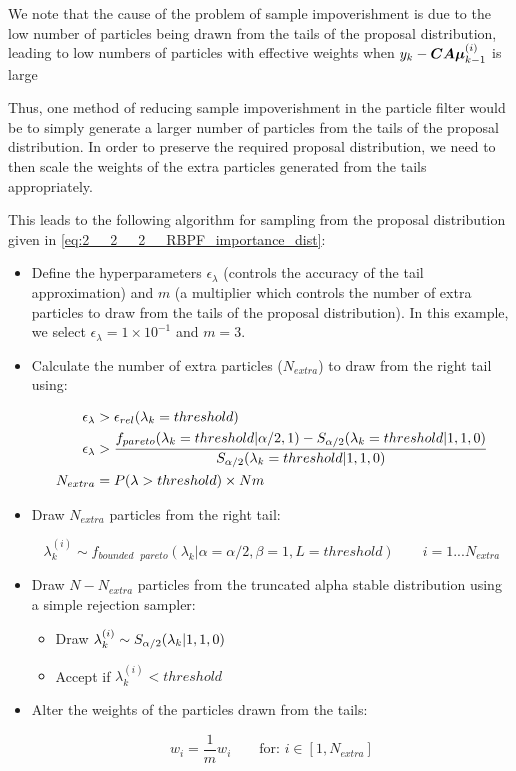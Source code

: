 \documentclass[../main.tex]{subfiles}
\begin{document}
We note that the cause of the problem of sample impoverishment is due to the low number of particles being drawn from the tails of the proposal distribution, leading to low numbers of particles with effective weights when $y_k - \bm{CA\mu}_{k-1}^{(i)}$ is large

Thus, one method of reducing sample impoverishment in the particle filter would be to simply generate a larger number of particles from the tails of the proposal distribution. In order to preserve the required proposal distribution, we need to then scale the weights of the extra particles generated from the tails appropriately. 

This leads to the following algorithm for sampling from the proposal distribution given in \autoref{eq:2__2__2__RBPF_importance_dist}: 

\begin{itemize}
	
	\item Define the hyperparameters $\epsilon_\lambda$ (controls the accuracy of the tail approximation) and $m$ (a multiplier which controls the number of extra particles to draw from the tails of the proposal distribution). In this example, we select $\epsilon_\lambda = 1 \times 10^{-1}$ and $m=3$.
	
	\item Calculate the number of extra particles ($N_{extra}$) to draw from the right tail using: 
	
	\begin{align}
	 \epsilon_\lambda  &>  \epsilon_{rel}(\lambda_k = threshold)\notag \\
	\epsilon_\lambda &> \frac{f_{pareto}(\lambda_k = threshold | \alpha/2, 1) - S_{\alpha/2}(\lambda_k  = threshold| 1,1,0)}{S_{\alpha/2}(\lambda_k = threshold | 1,1,0)}  \notag\\
	N_{extra} &= P(\lambda > threshold) \times Nm
	\end{align} 
	
	\item Draw $N_{extra}$ particles from the right tail:
	
	\begin{equation}
	\lambda_k^{(i)} \sim f_{bounded \text{ }pareto}(\lambda_k | \alpha = \alpha/2, \beta = 1, L = threshold) \qquad i=1...N_{extra}
	\end{equation}
	
	\item Draw $N - N_{extra}$ particles from the truncated alpha stable distribution using a simple rejection sampler:
	
	\begin{itemize}
		\item Draw $\lambda_k^{(i)} \sim S_{\alpha/2}(\lambda_k | 1, 1, 0)$
		\item Accept if $\lambda_k^{(i)} < threshold$
	\end{itemize}
	
	\item Alter the weights of the particles drawn from the tails:
	
	$$w_i = \frac{1}{m} w_i \qquad \text{for: } i \in [1, N_{extra}]$$	
\end{itemize}
\end{document}
